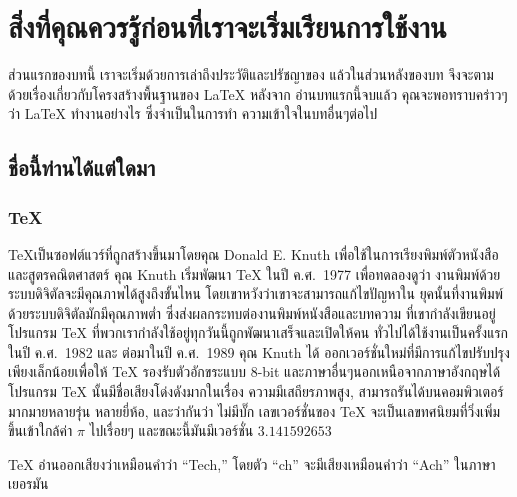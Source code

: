 
\chapter[สิ่งที่คุณควรรู้\ldots]{สิ่งที่คุณควรรู้ก่อนที่เราจะเริ่มเรียนการใช้งาน \LaTeXe}
ส่วนแรกของบทนี้ เราจะเริ่มด้วยการเล่าถึงประวัติและปรัชญาของ \LaTeXe{}
แล้วในส่วนหลังของบท จึงจะตามด้วยเรื่องเกี่ยวกับโครงสร้างพื้นฐานของ \LaTeX{} หลังจาก%
อ่านบทแรกนี้จบแล้ว คุณจะพอทราบคร่าวๆว่า \LaTeX{} ทำงานอย่างไร ซึ่งจำเป็นในการทำ%
ความเข้าใจในบทอื่นๆต่อไป

\section{ชื่อนี้ท่านได้แต่ใดมา}

\subsection{\TeX}

\TeX เป็นซอฟต์แวร์ที่ถูกสร้างขึ้นมาโดยคุณ Donald E. Knuth เพื่อใช้ในการเรียงพิมพ์ตัวหนังสือ
และสูตรคณิตศาสตร์ คุณ Knuth เริ่มพัฒนา \TeX{} ในปี ค.ศ.\ 1977 เพื่อทดลองดูว่า%
งานพิมพ์ด้วยระบบดิจิตัลจะมีคุณภาพได้สูงถึงขั้นไหน โดยเขาหวังว่าเขาจะสามารถแก้ไขปัญหาใน%
ยุคนั้นที่งานพิมพ์ด้วยระบบดิจิตัลมักมีคุณภาพต่ำ ซึ่งส่งผลกระทบต่องานพิมพ์หนังสือและบทความ%
ที่เขากำลังเขียนอยู่ โปรแกรม \TeX{} ที่พวกเรากำลังใช้อยู่ทุกวันนี้ถูกพัฒนาเสร็จและเปิดให้คน%
ทั่วไปได้ใช้งานเป็นครั้งแรกในปี ค.ศ.\ 1982 และ ต่อมาในปี ค.ศ.\ 1989 คุณ Knuth ได้%
ออกเวอร์ชั่นใหม่ที่มีการแก้ไขปรับปรุงเพียงเล็กน้อยเพื่อให้ \TeX{} รองรับตัวอักขระแบบ 8-bit
และภาษาอื่นๆนอกเหนือจากภาษาอังกฤษได้ โปรแกรม \TeX{} นั้นมีชื่อเสียงโด่งดังมากในเรื่อง%
ความมีเสถียรภาพสูง, สามารถรันได้บนคอมพิวเตอร์มากมายหลายรุ่น หลายยี่ห้อ, และว่ากันว่า%
ไม่มีบั๊ก เลขเวอร์ชั่นของ \TeX{} จะเป็นเลขทศนิยมที่วิ่งเพิ่มขึ้นเข้าใกล้ค่า $\pi$ ไปเรื่อยๆ
และขณะนี้มันมีเวอร์ชั่น $3.141592653$

\TeX{} อ่านออกเสียงว่าเหมือนคำว่า ``Tech,'' โดยตัว ``ch'' จะมีเสียงเหมือนคำว่า ``Ach''
ในภาษาเยอรมัน

\shbtoaddmoretranslation
